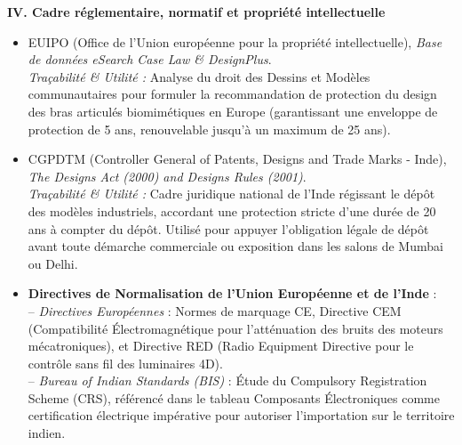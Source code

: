 \documentclass[11pt,a4paper]{article}
\begin{document}
\vspace{0.8em}
\textbf{IV. Cadre réglementaire, normatif et propriété intellectuelle}
\begin{itemize}
  \item EUIPO (Office de l'Union européenne pour la propriété intellectuelle), \textit{Base de données eSearch Case Law \& DesignPlus}. \\
  \textit{Traçabilité \& Utilité :} Analyse du droit des Dessins et Modèles communautaires pour formuler la recommandation de protection du design des bras articulés biomimétiques en Europe (garantissant une enveloppe de protection de 5 ans, renouvelable jusqu’à un maximum de 25 ans).
  
  \item CGPDTM (Controller General of Patents, Designs and Trade Marks - Inde), \textit{The Designs Act (2000) and Designs Rules (2001)}. \\
  \textit{Traçabilité \& Utilité :} Cadre juridique national de l'Inde régissant le dépôt des modèles industriels, accordant une protection stricte d'une durée de 20 ans à compter du dépôt. Utilisé pour appuyer l'obligation légale de dépôt avant toute démarche commerciale ou exposition dans les salons de Mumbai ou Delhi.
  
  \item \textbf{Directives de Normalisation de l'Union Européenne et de l'Inde} :
  \\ -- \textit{Directives Européennes} : Normes de marquage CE, Directive CEM (Compatibilité Électromagnétique pour l'atténuation des bruits des moteurs mécatroniques), et Directive RED (Radio Equipment Directive pour le contrôle sans fil des luminaires 4D).
  \\ -- \textit{Bureau of Indian Standards (BIS)} : Étude du Compulsory Registration Scheme (CRS), référencé dans le tableau \og Composants Électroniques \fg{} comme certification électrique impérative pour autoriser l'importation sur le territoire indien.
\end{itemize}
\end{document}
